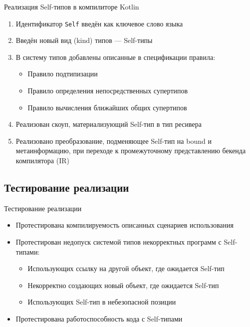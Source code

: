 \documentclass[aspectratio=169,usenames,dvipsnames]{beamer}
\begin{document}
    \begin{frame}{Реализация Self-типов в компилиторе Kotlin}
        \begin{enumerate}
            \item Идентификатор \texttt{Self} введён как ключевое слово языка
            \item Введён новый вид (kind) типов --- Self-типы
            \item В систему типов добавлены описанные в спецификации правила:
            \begin{itemize}
                \item Правило подтипизации
                \item Правило определения непосредственных супертипов
                \item Правило вычисления ближайших общих супертипов
            \end{itemize}
            \item Реализован скоуп, материализующий Self-тип в тип ресивера
            \item Реализовано преобразование, подменяющее Self-тип на bound и метаинформацию, при переходе к промежуточному представлению бекенда компилятора (IR)
        \end{enumerate}
    \end{frame}

    \subsection{Тестирование реализации}

    \begin{frame}{Тестирование реализации}
        \begin{itemize}
            \item Протестирована компилируемость описанных сценариев использования
            \item Протестирован недопуск системой типов некорректных программ с Self-типами:
            \begin{itemize}
                \item Использующих ссылку на другой объект, где ожидается Self-тип
                \item Некорректно создающих новый объект, где ожидается Self-тип
                \item Использующих Self-тип в небезопасной позиции
            \end{itemize}
            \item Протестирована работоспособность кода с Self-типами
        \end{itemize}
    \end{frame}
\end{document}

